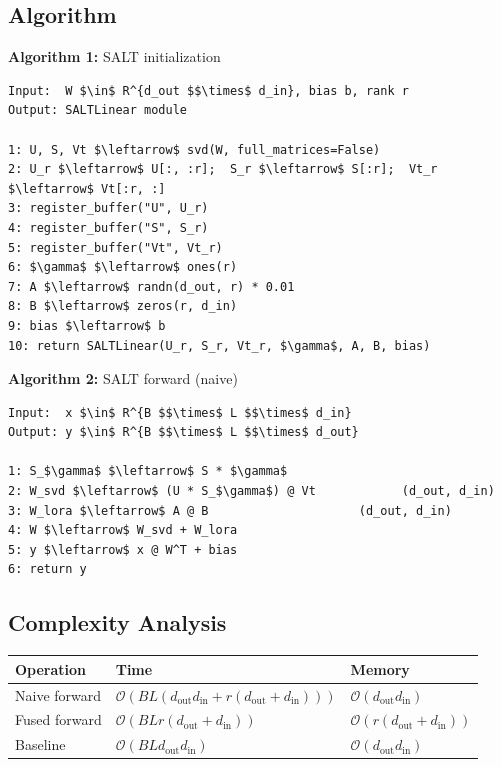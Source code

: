 \subsection{Algorithm}

\textbf{Algorithm 1:} SALT initialization
\begin{lstlisting}
Input:  W $\in$ R^{d_out $$\times$ d_in}, bias b, rank r
Output: SALTLinear module

1: U, S, Vt $\leftarrow$ svd(W, full_matrices=False)
2: U_r $\leftarrow$ U[:, :r];  S_r $\leftarrow$ S[:r];  Vt_r $\leftarrow$ Vt[:r, :]
3: register_buffer("U", U_r)
4: register_buffer("S", S_r)
5: register_buffer("Vt", Vt_r)
6: $\gamma$ $\leftarrow$ ones(r)
7: A $\leftarrow$ randn(d_out, r) * 0.01
8: B $\leftarrow$ zeros(r, d_in)
9: bias $\leftarrow$ b
10: return SALTLinear(U_r, S_r, Vt_r, $\gamma$, A, B, bias)
\end{lstlisting}

\textbf{Algorithm 2:} SALT forward (naive)
\begin{lstlisting}
Input:  x $\in$ R^{B $$\times$ L $$\times$ d_in}
Output: y $\in$ R^{B $$\times$ L $$\times$ d_out}

1: S_$\gamma$ $\leftarrow$ S * $\gamma$
2: W_svd $\leftarrow$ (U * S_$\gamma$) @ Vt            (d_out, d_in)
3: W_lora $\leftarrow$ A @ B                     (d_out, d_in)
4: W $\leftarrow$ W_svd + W_lora
5: y $\leftarrow$ x @ W^T + bias
6: return y
\end{lstlisting}

\subsection{Complexity Analysis}

\begin{table}[H]
\centering
\small
\begin{tabular}{lll}
\toprule
\textbf{Operation} & \textbf{Time} & \textbf{Memory} \\
\midrule
Naive forward & $\mathcal{O}(BL(d_\text{out} d_\text{in} + r(d_\text{out} + d_\text{in})))$ & $\mathcal{O}(d_\text{out} d_\text{in})$ \\
Fused forward & $\mathcal{O}(BL r (d_\text{out} + d_\text{in}))$ & $\mathcal{O}(r(d_\text{out} + d_\text{in}))$ \\
Baseline & $\mathcal{O}(BL d_\text{out} d_\text{in})$ & $\mathcal{O}(d_\text{out} d_\text{in})$ \\
\bottomrule
\end{tabular}
\end{table}

